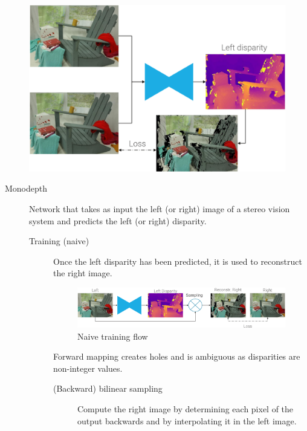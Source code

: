 \begin{description}
\begin{description}
                \begin{figure}[H]
                    \centering
                    \includegraphics[width=0.45\linewidth]{./img/_stereo_pipeline_reconstruction.pdf}
                \end{figure}
        \end{description}
\end{description}

\begin{description}
    \item[Monodepth]
        Network that takes as input the left (or right) image of a stereo vision system and predicts the left (or right) disparity.

        \begin{description}
            \item[Training (naive)] 
                Once the left disparity has been predicted, it is used to reconstruct the right image.

                \begin{figure}[H]
                    \centering
                    \includegraphics[width=0.8\linewidth]{./img/_monodepth_naive.pdf}
                    \caption{Naive training flow}
                \end{figure}

                \begin{remark}
                    Forward mapping creates holes and is ambiguous as disparities are non-integer values.
                \end{remark}

                \begin{description}
                    \item[(Backward) bilinear sampling] 
                        Compute the right image by determining each pixel of the output backwards and by interpolating it in the left image.


\end{description}
\end{description}
\end{description}
